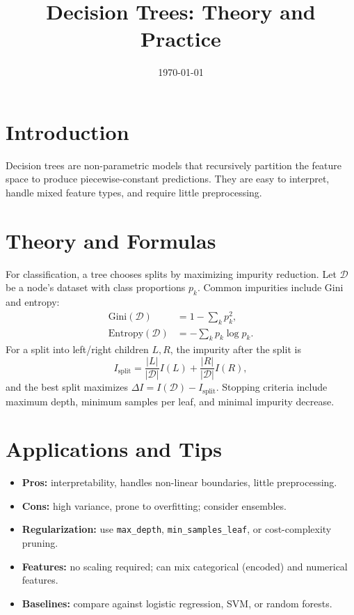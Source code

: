 \documentclass[11pt]{article}
\title{Decision Trees: Theory and Practice}
\author{}
\date{\today}
\begin{document}
\maketitle

\section{Introduction}
Decision trees are non-parametric models that recursively partition the feature space to produce piecewise-constant predictions. They are easy to interpret, handle mixed feature types, and require little preprocessing.

\section{Theory and Formulas}
For classification, a tree chooses splits by maximizing impurity reduction.
Let $\mathcal{D}$ be a node's dataset with class proportions $p_k$. Common impurities include Gini and entropy:
\begin{align}
\text{Gini}(\mathcal{D}) &= 1 - \sum_k p_k^2,\\
\text{Entropy}(\mathcal{D}) &= -\sum_k p_k \log p_k.
\end{align}
For a split into left/right children $L,R$, the impurity after the split is
\begin{equation}
I_{\text{split}} = \frac{|L|}{|\mathcal{D}|} I(L) + \frac{|R|}{|\mathcal{D}|} I(R),
\end{equation}
and the best split maximizes $\Delta I = I(\mathcal{D}) - I_{\text{split}}$. Stopping criteria include maximum depth, minimum samples per leaf, and minimal impurity decrease.

\section{Applications and Tips}
\begin{itemize}
  \item \textbf{Pros:} interpretability, handles non-linear boundaries, little preprocessing.
  \item \textbf{Cons:} high variance, prone to overfitting; consider ensembles.
  \item \textbf{Regularization:} use \texttt{max\_depth}, \texttt{min\_samples\_leaf}, or cost-complexity pruning.
  \item \textbf{Features:} no scaling required; can mix categorical (encoded) and numerical features.
  \item \textbf{Baselines:} compare against logistic regression, SVM, or random forests.
\end{itemize}
\end{document}
